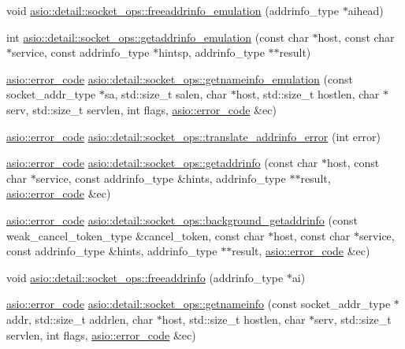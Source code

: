 \begin{DoxyCompactItemize}
\item 
void \hyperlink{namespaceasio_1_1detail_1_1socket__ops_a2ae77ea5d1ef931d4a3fc60c455ca629}{asio\+::detail\+::socket\+\_\+ops\+::freeaddrinfo\+\_\+emulation} (addrinfo\+\_\+type $\ast$aihead)
\item 
int \hyperlink{namespaceasio_1_1detail_1_1socket__ops_a37ce1013248d51873bfe63fffd753494}{asio\+::detail\+::socket\+\_\+ops\+::getaddrinfo\+\_\+emulation} (const char $\ast$host, const char $\ast$service, const addrinfo\+\_\+type $\ast$hintsp, addrinfo\+\_\+type $\ast$$\ast$result)
\item 
\hyperlink{classasio_1_1error__code}{asio\+::error\+\_\+code} \hyperlink{namespaceasio_1_1detail_1_1socket__ops_a6d40fe3b6bb610e7828fe81ab3f77183}{asio\+::detail\+::socket\+\_\+ops\+::getnameinfo\+\_\+emulation} (const socket\+\_\+addr\+\_\+type $\ast$sa, std\+::size\+\_\+t salen, char $\ast$host, std\+::size\+\_\+t hostlen, char $\ast$serv, std\+::size\+\_\+t servlen, int flags, \hyperlink{classasio_1_1error__code}{asio\+::error\+\_\+code} \&ec)
\item 
\hyperlink{classasio_1_1error__code}{asio\+::error\+\_\+code} \hyperlink{namespaceasio_1_1detail_1_1socket__ops_aaf434e081cfea7b91f2c1da24879b5db}{asio\+::detail\+::socket\+\_\+ops\+::translate\+\_\+addrinfo\+\_\+error} (int error)
\item 
\hyperlink{classasio_1_1error__code}{asio\+::error\+\_\+code} \hyperlink{namespaceasio_1_1detail_1_1socket__ops_aa4e7b340e0da1fafb23b035bf199a11d}{asio\+::detail\+::socket\+\_\+ops\+::getaddrinfo} (const char $\ast$host, const char $\ast$service, const addrinfo\+\_\+type \&hints, addrinfo\+\_\+type $\ast$$\ast$result, \hyperlink{classasio_1_1error__code}{asio\+::error\+\_\+code} \&ec)
\item 
\hyperlink{classasio_1_1error__code}{asio\+::error\+\_\+code} \hyperlink{namespaceasio_1_1detail_1_1socket__ops_a95f143eaae7546fb51cfd7856ac27786}{asio\+::detail\+::socket\+\_\+ops\+::background\+\_\+getaddrinfo} (const weak\+\_\+cancel\+\_\+token\+\_\+type \&cancel\+\_\+token, const char $\ast$host, const char $\ast$service, const addrinfo\+\_\+type \&hints, addrinfo\+\_\+type $\ast$$\ast$result, \hyperlink{classasio_1_1error__code}{asio\+::error\+\_\+code} \&ec)
\item 
void \hyperlink{namespaceasio_1_1detail_1_1socket__ops_a2b6faeb581fcd7c756181a7604043f71}{asio\+::detail\+::socket\+\_\+ops\+::freeaddrinfo} (addrinfo\+\_\+type $\ast$ai)
\item 
\hyperlink{classasio_1_1error__code}{asio\+::error\+\_\+code} \hyperlink{namespaceasio_1_1detail_1_1socket__ops_a599eab2306bdcbab292bd36fda70a0f3}{asio\+::detail\+::socket\+\_\+ops\+::getnameinfo} (const socket\+\_\+addr\+\_\+type $\ast$addr, std\+::size\+\_\+t addrlen, char $\ast$host, std\+::size\+\_\+t hostlen, char $\ast$serv, std\+::size\+\_\+t servlen, int flags, \hyperlink{classasio_1_1error__code}{asio\+::error\+\_\+code} \&ec)
$$
\end{DoxyCompactItemize}
